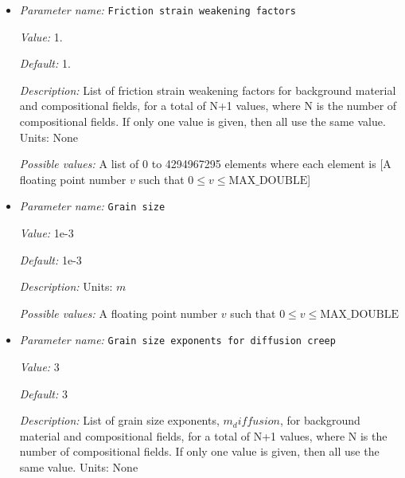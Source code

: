 \begin{itemize}
{\it Default:} 1.


{\it Description:} List of strain weakening interval final strains for background material and compositional fields, for a total of N+1 values, where N is the number of compositional fields. If only one value is given, then all use the same value.  Units: None


{\it Possible values:} A list of 0 to 4294967295 elements where each element is [A floating point number $v$ such that $0 \leq v \leq \text{MAX\_DOUBLE}$]
\item {\it Parameter name:} {\tt Friction strain weakening factors}
\label{parameters:Material model/Visco Plastic/Friction strain weakening factors}


{\it Value:} 1.


{\it Default:} 1.


{\it Description:} List of friction strain weakening factors for background material and compositional fields, for a total of N+1 values, where N is the number of compositional fields. If only one value is given, then all use the same value.  Units: None


{\it Possible values:} A list of 0 to 4294967295 elements where each element is [A floating point number $v$ such that $0 \leq v \leq \text{MAX\_DOUBLE}$]
\item {\it Parameter name:} {\tt Grain size}
\label{parameters:Material model/Visco Plastic/Grain size}


{\it Value:} 1e-3


{\it Default:} 1e-3


{\it Description:} Units: $m$


{\it Possible values:} A floating point number $v$ such that $0 \leq v \leq \text{MAX\_DOUBLE}$
\item {\it Parameter name:} {\tt Grain size exponents for diffusion creep}
\label{parameters:Material model/Visco Plastic/Grain size exponents for diffusion creep}


{\it Value:} 3


{\it Default:} 3


{\it Description:} List of grain size exponents, $m_diffusion$, for background material and compositional fields, for a total of N+1 values, where N is the number of compositional fields. If only one value is given, then all use the same value.  Units: None



\end{itemize}
